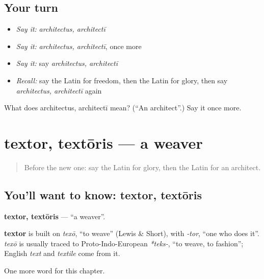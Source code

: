 \subsection*{Your turn}
\begin{itemize}
\raggedright
  \item \emph{Say it:} \emph{architectus, architectī}
  \item \emph{Say it:} \emph{architectus, architectī}, once more
  \item \emph{Say it:} say \emph{architectus, architectī}
  \item \emph{Recall:} say the Latin for freedom, then the Latin for glory, then say \emph{architectus, architectī} again
\end{itemize}

\begin{tcolorbox}[breakable,colback=teal!4,colframe=teal!35!black,title={Before you move on}]
What does architectus, architectī mean? (\textquotedblleft{}An architect\textquotedblright{}.) Say it once more.
\end{tcolorbox}
\section[textor, textōris]{textor, textōris — a weaver}

\label{lesson:LA-C188-textor}



\begin{quote}
Before the new one: say the Latin for glory, then the Latin for an architect.
\end{quote}

\subsection*{You'll want to know: textor, textōris}
\textbf{textor, textōris} — \textquotedblleft{}a weaver\textquotedblright{}.

\begin{cousinweb}
\textbf{textor} is built on \emph{texō}, \textquotedblleft{}to weave\textquotedblright{} (Lewis \& Short), with \emph{-tor}, \textquotedblleft{}one who does it\textquotedblright{}. \emph{texō} is usually traced to Proto-Indo-European \emph{*teks-}, \textquotedblleft{}to weave, to fashion\textquotedblright{}; English \emph{text} and \emph{textile} come from it.
\end{cousinweb}

\begin{grammarlens}[title={What you've built}]
One more word for this chapter.
\end{grammarlens}

